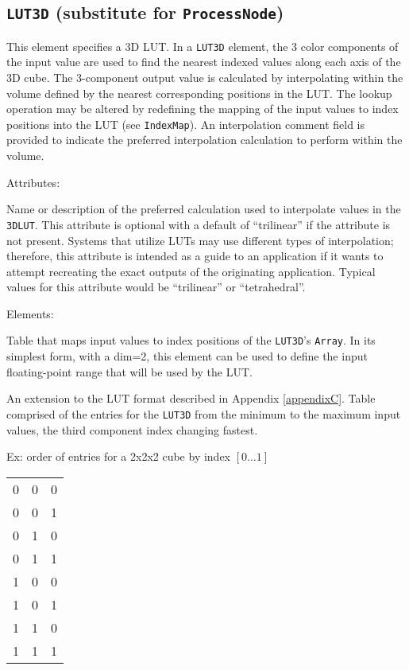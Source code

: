 \subsection{\texttt{LUT3D} (substitute for \texttt{ProcessNode})}
This element specifies a 3D LUT. In a \texttt{LUT3D} element, the 3 color components of the input value are used to find the nearest indexed values along each axis of the 3D cube. The 3-component output value is calculated by interpolating within the volume defined by the nearest corresponding positions in the LUT. The lookup operation may be altered by redefining the mapping of the input values to index positions into the LUT (see \texttt{IndexMap}). An interpolation comment field is provided to indicate the preferred interpolation calculation to perform within the volume.

Attributes:
\begin{xmlfields}
	\xmlitem[interpolation][optional] Name or description of the preferred calculation used to interpolate values in the \texttt{3DLUT}. This attribute is optional with a default of ``trilinear'' if the attribute is not present. Systems that utilize LUTs may use different types of interpolation; therefore, this attribute is  intended as a guide to an application if it wants to attempt recreating the exact outputs of the originating application. Typical values for this attribute would be ``trilinear'' or ``tetrahedral''.
\end{xmlfields}

Elements:
\begin{xmlfields}
	\xmlitem[IndexMap][optional] Table that maps input values to index positions of the \texttt{LUT3D}'s \texttt{Array}. 
		In its simplest form, with a dim=2, this element can be used to define the input floating-point range that will be used by the LUT.\par
		An extension to the LUT format described in Appendix \ref{appendixC}.
	\xmlitem[Array][required] Table comprised of the entries for the \texttt{LUT3D} from the minimum to the maximum input values, the third component index changing fastest.

		Ex:   order of entries for a 2x2x2 cube by index $[0 \ldots 1]$
		
		\begin{center}
			\begin{tabularx}{1in}{XXX}
				0 & 0 & 0 \\
				0 & 0 & 1 \\
				0 & 1 & 0 \\
				0 & 1 & 1 \\
				1 & 0 & 0 \\
				1 & 0 & 1 \\
				1 & 1 & 0 \\
				1 & 1 & 1 \\
			\end{tabularx}
		\end{center}
\end{xmlfields}

